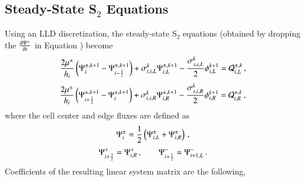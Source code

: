 \subsection{Steady-State \texorpdfstring{S$_2$}{S-2} Equations}
Using an LLD discretization, the steady-state
S$_2$ equations (obtained by dropping the $\frac{\partial \Psi^\pm}{\partial t}$ in Equation
) become
\begin{equation}\lequ{S2ssL}
  \frac{2\mu^\pm}{h_i}\fn{\Psi^{\pm,k+1}_i - \Psi^{\pm,k+1}_{i-\half}}
  +\sigma_{t,i,L}^k\Psi\iL^{\pm,k+1}
  -\frac{\sigma_{s,i,L}^k}{2}\phi\iL^{k+1}
  =\Q_{i,L}^{\pm,k} \pec
\end{equation}
\begin{equation}\lequ{S2ssR}
  \frac{2\mu^\pm}{h_i}\fn{\Psi^{\pm,k+1}_{i+\half} - \Psi^{\pm,k+1}_i}
  +\sigma_{t,i,R}^k\Psi\iR^{\pm,k+1}
  -\frac{\sigma_{s,i,R}^k}{2}\phi\iR^{k+1}
  =\Q_{i,R}^{\pm,k} \pec
\end{equation}
where the cell center and edge fluxes are defined as
\begin{equation}
  \Psi_i^\pm=\frac{1}{2}\left( \Psi_{i,L}^\pm + \Psi_{i,R}^\pm \right) \, ,
\end{equation}
\begin{equation}
  \Psi_{i+\frac{1}{2}}^+=\Psi_{i,R}^+ \, ,\qquad \Psi_{i+\frac{1}{2}}^-=\Psi_{i+1,L}^- \, .
\end{equation}
Coefficients of the resulting linear system matrix are the following,
